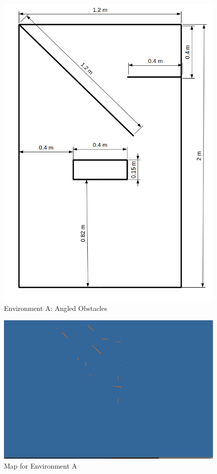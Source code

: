 \begin{figure}[h]
\centering
\includegraphics[scale=0.4]{Chapter4/images/experiment_1.png}
\caption{Environment A: Angled Obstacles}
\label{fig:experiment_a}
\end{figure}

\begin{figure}[h]
\centering
\includegraphics[scale=0.4]{Chapter4/images/experiment_1_map.png}
\caption{Map for Environment A}
\label{fig:experiment_a_map}
\end{figure}

